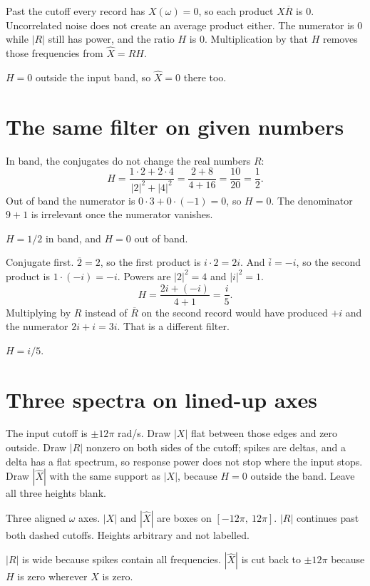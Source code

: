 \documentclass[11pt,letterpaper]{article}
\newcommand{\ans}[1]{\par\vspace{2pt}{\bfseries #1}\quad}
\begin{document}
\ans{2.}
Past the cutoff every record has $X(\omega) = 0$, so each product $X\overline{R}$ is $0$. Uncorrelated noise does not create an average product either. The numerator is $0$ while $|R|$ still has power, and the ratio $H$ is $0$. Multiplication by that $H$ removes those frequencies from $\hat{X} = RH$.
\begin{result}
$H = 0$ outside the input band, so $\hat{X} = 0$ there too.
\end{result}

\section{The same filter on given numbers}

\ans{1.}
In band, the conjugates do not change the real numbers $R$:
\[
H = \frac{1\cdot 2 + 2\cdot 4}{|2|^2 + |4|^2} = \frac{2 + 8}{4 + 16} = \frac{10}{20} = \frac12.
\]
Out of band the numerator is $0\cdot 3 + 0\cdot(-1) = 0$, so $H = 0$. The denominator $9 + 1$ is irrelevant once the numerator vanishes.
\begin{result}
$H = 1/2$ in band, and $H = 0$ out of band.
\end{result}

\ans{2.}
Conjugate first. $\overline{2} = 2$, so the first product is $i\cdot 2 = 2i$. And $\overline{i} = -i$, so the second product is $1\cdot(-i) = -i$. Powers are $|2|^2 = 4$ and $|i|^2 = 1$.
\[
H = \frac{2i + (-i)}{4 + 1} = \frac{i}{5}.
\]
Multiplying by $R$ instead of $\overline{R}$ on the second record would have produced $+i$ and the numerator $2i + i = 3i$. That is a different filter.
\begin{result}
$H = i/5$.
\end{result}

\section{Three spectra on lined-up axes}

\ans{1.}
The input cutoff is $\pm 12\pi$ rad/s. Draw $|X|$ flat between those edges and zero outside. Draw $|R|$ nonzero on both sides of the cutoff; spikes are deltas, and a delta has a flat spectrum, so response power does not stop where the input stops. Draw $|\hat{X}|$ with the same support as $|X|$, because $H = 0$ outside the band. Leave all three heights blank.
\begin{sketch}
Three aligned $\omega$ axes. $|X|$ and $|\hat{X}|$ are boxes on $[-12\pi,\ 12\pi]$. $|R|$ continues past both dashed cutoffs. Heights arbitrary and not labelled.
\end{sketch}
\begin{result}
$|R|$ is wide because spikes contain all frequencies. $|\hat{X}|$ is cut back to $\pm 12\pi$ because $H$ is zero wherever $X$ is zero.
\end{result}
\end{document}
